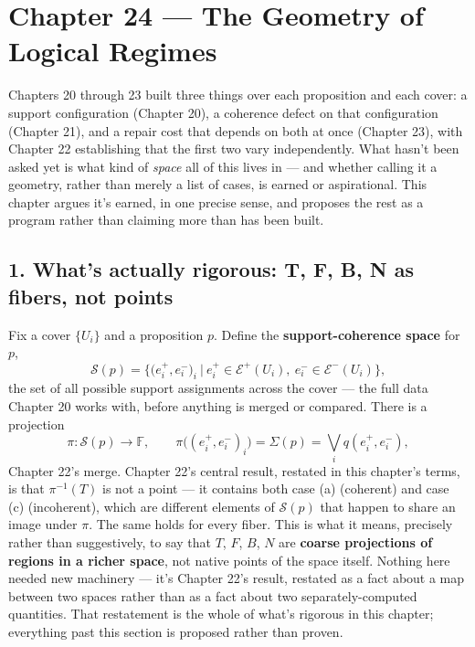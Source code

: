 \hypertarget{chapter-24-the-geometry-of-logical-regimes}{%
\chapter*{Chapter 24 --- The Geometry of Logical Regimes}
\label{chapter-24-the-geometry-of-logical-regimes}}

Chapters 20 through 23 built three things over each proposition and each
cover: a support configuration (Chapter 20), a coherence defect on that
configuration (Chapter 21), and a repair cost that depends on both at
once (Chapter 23), with Chapter 22 establishing that the first two vary
independently. What hasn't been asked yet is what kind of \emph{space} all of
this lives in --- and whether calling it a geometry, rather than merely a
list of cases, is earned or aspirational. This chapter argues it's
earned, in one precise sense, and proposes the rest as a program rather
than claiming more than has been built.

\hypertarget{whats-actually-rigorous-t-f-b-n-as-fibers-not-points}{%
\section{1. What's actually rigorous: T, F, B, N as fibers, not points}\label{whats-actually-rigorous-t-f-b-n-as-fibers-not-points}}

Fix a cover \(\{U_i\}\) and a proposition \(p\). Define the \textbf{support-coherence
space} for \(p\),
\[\mathcal{S}(p) = \Big\{ \big(e^+_i, e^-_i\big)_i \ \Big|\ e^+_i \in \mathcal{E}^+(U_i),\ e^-_i \in \mathcal{E}^-(U_i) \Big\},\]
the set of all possible support assignments across the cover --- the full
data Chapter 20 works with, before anything is merged or compared. There
is a projection
\[\pi : \mathcal{S}(p) \to \mathbb{F}, \qquad \pi\big((e^+_i,e^-_i)_i\big) = \Sigma(p) = \bigvee_i q(e^+_i,e^-_i),\]
Chapter 22's merge. Chapter 22's central result, restated in this
chapter's terms, is that \(\pi^{-1}(T)\) is not a point --- it contains both
case (a) (coherent) and case (c) (incoherent), which are different
elements of \(\mathcal{S}(p)\) that happen to share an image under \(\pi\).
The same holds for every fiber. This is what it means, precisely rather
than suggestively, to say that \(T\), \(F\), \(B\), \(N\) are \textbf{coarse
projections of regions in a richer space}, not native points of the
space itself. Nothing here needed new machinery --- it's Chapter 22's
result, restated as a fact about a map between two spaces rather than as
a fact about two separately-computed quantities. That restatement is the
whole of what's rigorous in this chapter; everything past this section is
proposed rather than proven.

